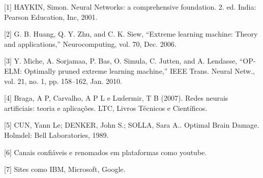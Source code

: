 \documentclass{article}
\begin{document}
[1] HAYKIN, Simon. Neural Networks: a comprehensive foundation. 2. ed. India: Pearson Education, Inc, 2001.

\vspace{20pt}

[2] G. B. Huang, Q. Y. Zhu, and C. K. Siew, “Extreme learning machine: Theory and applications,” Neurocomputing, vol. 70, Dec. 2006.   

\vspace{20pt}

[3] Y. Miche, A. Sorjamaa, P. Bas, O. Simula, C. Jutten, and A. Lendasse, “OP-ELM: Optimally pruned extreme learning machine,” IEEE Trans. Neural Netw., vol. 21, no. 1, pp. 158–162, Jan. 2010.


\vspace{20pt}

[4] Braga, A P, Carvalho, A P L e Ludermir, T B (2007). Redes neurais artificiais: teoria e aplicações. LTC, Livros Técnicos e Científicos.

\vspace{20pt}

[5] CUN, Yann Le; DENKER, John S.; SOLLA, Sara A.. Optimal Brain Damage. Holmdel: Bell Laboratories, 1989.

\vspace{20pt}

[6] Canais confiáveis e renomados em plataformas como youtube.

\vspace{20pt}

[7] Sites como IBM, Microsoft, Google.
\end{document}
